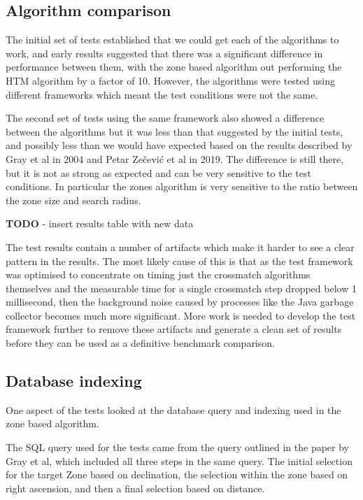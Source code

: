\documentclass{article}
\newcommand{\crossmatch} {crossmatch\xspace}
\begin{document}
\subsection{Algorithm comparison}
\label{algorithm-comparison}

The initial set of tests established that we could get each of the algorithms to work, and early results suggested that there was a significant difference in performance between them, with the zone based algorithm out performing the HTM algorithm by a factor of 10. However, the algorithms were tested using different frameworks which meant the test conditions were not the same.

The second set of tests using the same framework also showed a difference between the algorithms but it was less than that suggested by the initial tests, and possibly less than we would have expected based on the results described by Gray et al in 2004\cite{Gray-2004} and Petar Zečević et al in 2019\cite{Zecevic-2019}.
The difference is still there, but it is not as strong as expected and can be very sensitive to the test conditions. In particular the zones algorithm is very sensitive to the ratio between the zone size and search radius.

\textbf{TODO} - insert results table with new data

The test results contain a number of artifacts which make it harder to see a clear pattern in the results. The most likely cause of this is that as the test framework was optimised to concentrate on timing just the \crossmatch algorithms themselves and the measurable time for a single \crossmatch step dropped below 1 millisecond, then the background noise caused by processes like the Java garbage collector becomes much more significant.
More work is needed to develop the test framework further to remove these artifacts and generate a clean set of results before they can be used as a definitive benchmark comparison.

\subsection{Database indexing}
\label{database-indexing}

One aspect of the tests looked at the database query and indexing used in the zone based algorithm.

The SQL query used for the tests came from the query outlined in the paper by Gray et al, which included all three steps in the same query. The initial selection for the target Zone based on declination, the selection within the zone based on right ascension, and then a final selection based on distance.
\end{document}
